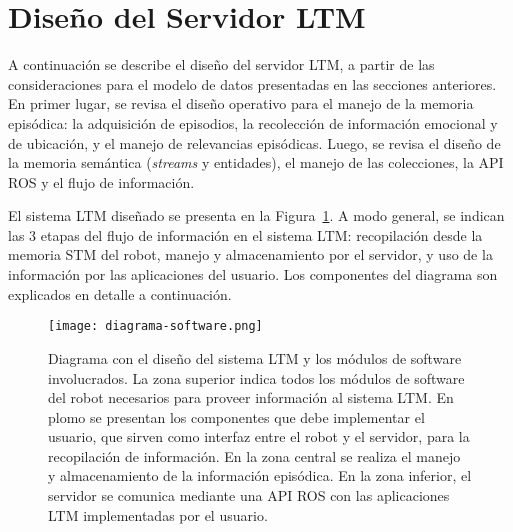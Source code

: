 

\section{Diseño del Servidor LTM}\label{sec:design-server}

A continuación se describe el diseño del servidor LTM, a partir de las consideraciones para el modelo de datos presentadas en las secciones anteriores. En primer lugar, se revisa el diseño operativo para el manejo de la memoria episódica: la adquisición de episodios, la recolección de información emocional y de ubicación, y el manejo de relevancias episódicas. Luego, se revisa el diseño de la memoria semántica (\textit{streams} y entidades), el manejo de las colecciones, la API ROS y el flujo de información.

El sistema LTM diseñado se presenta en la Figura~\ref{img:diagrama-software}. A modo general, se indican las 3 etapas del flujo de información en el sistema LTM: recopilación desde la memoria STM del robot, manejo y almacenamiento por el servidor, y uso de la información por las aplicaciones del usuario. Los componentes del diagrama son explicados en detalle a continuación.

\begin{figure}[!ht]
	\centering
	\texttt{[image: diagrama-software.png]}
	\caption[Diseño del sistema LTM y módulos de software involucrados.]
	{\small Diagrama con el diseño del sistema LTM y los módulos de software involucrados. La zona superior indica todos los módulos de software del robot necesarios para proveer información al sistema LTM. En plomo se presentan los componentes que debe implementar el usuario, que sirven como interfaz entre el robot y el servidor, para la recopilación de información. En la zona central se realiza el manejo y almacenamiento de la información episódica. En la zona inferior, el servidor se comunica mediante una API ROS con las aplicaciones LTM implementadas por el usuario.}
	\label{img:diagrama-software}
\end{figure}


